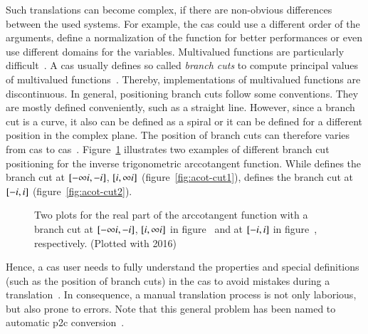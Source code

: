 Such translations can become complex, if there are non-obvious differences between the used systems. For example, the \gls*{cas} could use a different order of the arguments, define a normalization of the function for better performances or even use different domains for the variables. Multivalued functions are particularly difficult~\cite{AISC:MultivaluedFunctions}. A \gls*{cas} usually defines so called \textit{branch cuts} to compute principal values of multivalued functions~\cite{Maple:Cuts}. Thereby, implementations of multivalued functions are discontinuous. In general, positioning branch cuts follow some conventions. They are mostly defined conveniently, such as a straight line. However, since a branch cut is a curve, it also can be defined as a spiral or it can be defined for a different position in the complex plane. The position of branch cuts can therefore varies from \gls*{cas} to \gls*{cas}~\cite{Branches:acot}. Figure~\ref{fig:acot-cut-compare} illustrates two examples of different branch cut positioning for the inverse trigonometric arccotangent function. While \Maple{} defines the branch cut at ${[-\infty{i}, -{i}]}$, ${[{i},\infty{i}]}$ (figure~\ref{fig:acot-cut1}), \Mathematica{} defines the branch cut at ${[-{i}, {i}]}$ (figure~\ref{fig:acot-cut2}).

\begin{figure}[ht]
    \centering
    \hspace{0.5cm}
    \caption{Two plots for the real part of the arccotangent function with a branch cut at $[-\infty{i}, -{i}]$, $[{i},\infty{i}]$ in figure~\protect{} and at $[-{i}, {i}]$ in figure~\protect{}, respectively. (Plotted with \Maple{} 2016)}
    \label{fig:acot-cut-compare}
\end{figure}

Hence, a \gls*{cas} user needs to fully understand the properties and special definitions (such as the position of branch cuts) in the \gls*{cas} to avoid mistakes during a translation~\cite{Maple:Cuts}. In consequence, a manual translation process is not only laborious, but also prone to errors. Note that this general problem has been named to automatic \gls*{p2c} conversion~\cite{POM-Tagger}.

